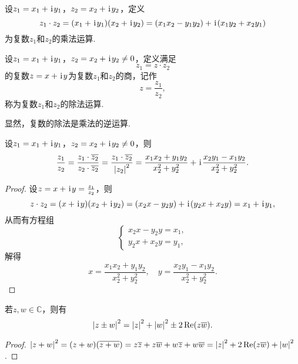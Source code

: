 \begin{definition}[复数乘法]
设\(z_1 = x_1 + \kern1pt\mathrm{i}\kern1pt y_1\)，\(z_2 = x_2 + \kern1pt\mathrm{i}\kern1pt y_2\)，定义\begin{equation*}
z_1 \cdot z_2
= (x_1 + \kern1pt\mathrm{i}\kern1pt y_1)(x_2 + \kern1pt\mathrm{i}\kern1pt y_2)
= (x_1 x_2 - y_1 y_2)+\kern1pt\mathrm{i}\kern1pt(x_1 y_2 + x_2 y_1)
\end{equation*}为复数\(z_1\)和\(z_2\)的乘法运算.
\end{definition}

\begin{definition}[复数除法]
设\(z_1 = x_1 + \kern1pt\mathrm{i}\kern1pt y_1\)，\(z_2 = x_2 + \kern1pt\mathrm{i}\kern1pt y_2 \neq 0\)，定义满足\begin{equation*}
z_1 = z \cdot z_2
\end{equation*}的复数\(z = x + \kern1pt\mathrm{i}\kern1pt y\)为复数\(z_1\)和\(z_2\)的商，记作\begin{equation*}
z = \frac{z_1}{z_2},
\end{equation*}称为复数\(z_1\)和\(z_2\)的除法运算.

显然，复数的除法是乘法的逆运算.
\end{definition}

\begin{theorem}
设\(z_1 = x_1 + \kern1pt\mathrm{i}\kern1pt y_1\)，\(z_2 = x_2 + \kern1pt\mathrm{i}\kern1pt y_2 \neq 0\)，则\begin{equation*}
\frac{z_1}{z_2}
= \frac{z_1 \cdot \overline{z_2}}{z_2 \cdot \overline{z_2}}
= \frac{z_1 \cdot \overline{z_2}}{\abs{z_2}^2}
= \frac{x_1 x_2 + y_1 y_2}{x_2^2 + y_2^2}
+ \kern1pt\mathrm{i}\kern1pt \frac{x_2 y_1 - x_1 y_2}{x_2^2 + y_2^2}.
\end{equation*}
\begin{proof}
设\(z = x + \kern1pt\mathrm{i}\kern1pt y = \frac{z_1}{z_2}\)，则\begin{equation*}
z \cdot z_2 = (x + \kern1pt\mathrm{i}\kern1pt y)(x_2 + \kern1pt\mathrm{i}\kern1pt y_2)
= (x_2 x - y_2 y) + \kern1pt\mathrm{i}\kern1pt(y_2 x + x_2 y)
= x_1 + \kern1pt\mathrm{i}\kern1pt y_1,
\end{equation*}从而有方程组\begin{equation*}
\left\{ \begin{array}{l}
x_2 x - y_2 y = x_1, \\
y_2 x + x_2 y = y_1,
\end{array} \right.
\end{equation*}解得\begin{equation*}
x = \frac{x_1 x_2 + y_1 y_2}{x_2^2 + y_2^2},
\quad
y = \frac{x_2 y_1 - x_1 y_2}{x_2^2 + y_2^2}.
\end{equation*}
\end{proof}
\end{theorem}

\begin{theorem}
若\(z,w \in \mathbb{C}\)，则有\begin{equation}
\abs{z \pm w}^2 = \abs{z}^2 + \abs{w}^2 \pm 2 \Re(z \overline{w}).
\end{equation}
\begin{proof}
\(
\abs{z + w}^2
= (z + w) (\overline{z + w})
= z\overline{z} + z\overline{w} + w\overline{z} + w\overline{w}
= \abs{z}^2 + 2 \Re(z\overline{w}) + \abs{w}^2
\).
\end{proof}
\end{theorem}

